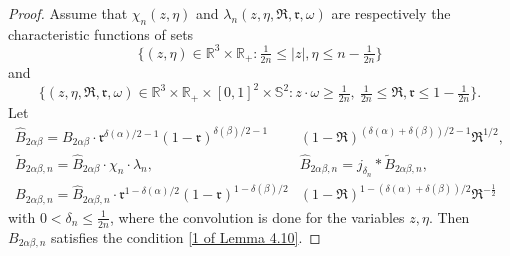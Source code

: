\documentclass[reqno,11pt]{amsart}
\numberwithin{equation}{section}
\def\R{\mathbb{R}}
\begin{document}
\begin{proof}
	Assume that $\chi_n (z,\eta )$ and $\lambda_n(z,\eta ,\mathfrak{R} ,\mathfrak{r}, \omega )$ are respectively the characteristic functions of sets
	\begin{equation*}
		\{(z,\eta )\in \R^3 \times \R_+ :\tfrac{1}{2n}\leq |z|,\eta \leq n-\tfrac{1}{2n} \}
	\end{equation*}
	and 
	\begin{equation*}
		\{(z,\eta ,\mathfrak{R} ,\mathfrak{r}, \omega )\in \R^3 \times \R_+ \times [0,1]^2 \times \mathbb{S}^2: z\cdot \omega \geq \tfrac{1}{2n},\ \tfrac{1}{2n}\leq \mathfrak{R},\mathfrak{r} \leq 1-\tfrac{1}{2n}\}.
	\end{equation*}
	Let
	\begin{equation*}
		\begin{aligned}
		\hat{B}_{2\alpha \beta }=B_{2\alpha \beta } \cdot \mathfrak{r}^{\delta(\alpha)/2-1 }(1-\mathfrak{r})^{\delta(\beta )/2-1}&(1-\mathfrak{R})^{(\delta(\alpha)+\delta(\beta ))/2-1} \mathfrak{R}^{1/2},\\
  \tilde{B}_{2\alpha \beta,n } =\hat{B}_{2\alpha \beta } \cdot \chi_n \cdot \lambda_n,\quad & 
  \hat{B}_{2\alpha \beta ,n }=j_{\delta_n }* \tilde{B}_{2\alpha \beta ,n},\\
  B_{2\alpha \beta ,n }= \hat{B}_{2\alpha \beta,n } \cdot \mathfrak{r}^{1-\delta(\alpha)/2 }(1-\mathfrak{r})^{1-\delta(\beta )/2}&(1-\mathfrak{R})^{1-(\delta(\alpha)+\delta(\beta ))/2} \mathfrak{R}^{-\frac{1}{2}}
		\end{aligned}
	\end{equation*}
	with $0< \delta_n \leq \frac{1}{2n}$, where the convolution is done for the variables $z, \eta$. Then $B_{2\alpha \beta ,n }$ satisfies the condition \eqref{1 of Lemma 4.10}.


\end{proof}
\end{document}
